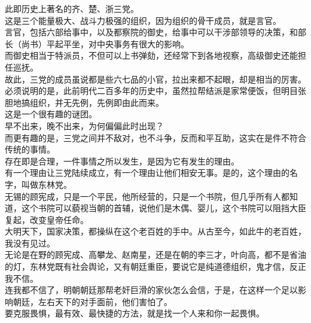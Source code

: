\begin{multicols}{\theparacolNo}
此即历史上著名的齐、楚、浙三党。\\

这是三个能量极大、战斗力极强的组织，因为组织的骨干成员，就是言官。\\

言官，包括六部给事中，以及都察院的御史，给事中可以干涉部领导的决策，和部长（尚书）平起平坐，对中央事务有很大的影响。\\

而御史相当于特派员，不但可以上书弹劾，还经常下到各地视察，高级御史还能担任巡抚。\\

故此，三党的成员虽说都是些六七品的小官，拉出来都不起眼，却是相当的厉害。\\

必须说明的是，此前明代二百多年的历史中，虽然拉帮结派是家常便饭，但明目张胆地搞组织，并无先例，先例即由此而来。\\

这是一个很有趣的谜团。\\

早不出来，晚不出来，为何偏偏此时出现？\\

而更有趣的是，三党之间并不敌对，也不斗争，反而和平互助，这实在是件不符合传统的事情。\\

存在即是合理，一件事情之所以发生，是因为它有发生的理由。\\

有一个理由让三党陆续成立，有一个理由让他们相安无事。是的，这个理由的名字，叫做东林党。\\

无锡的顾宪成，只是一个平民，他所经营的，只是一个书院，但几乎所有人都知道，这个书院可以藐视当朝的首辅，说他们是木偶、婴儿，这个书院可以阻挡大臣复起，改变皇帝任命。\\

大明天下，国家决策，都操纵在这个老百姓的手中。从古至今，如此牛的老百姓，我没有见过。\\

无论是在野的顾宪成、高攀龙、赵南星，还是在朝的李三才，叶向高，都不是省油的灯，东林党既有社会舆论，又有朝廷重臣，要说它是纯道德组织，鬼才信，反正我不信。\\

连我都不信了，明朝朝廷那帮老奸巨滑的家伙怎么会信，于是，在这样一个足以影响朝廷，左右天下的对手面前，他们害怕了。\\

要克服畏惧，最有效、最快捷的方法，就是找一个人来和你一起畏惧。\\


\end{multicols}
